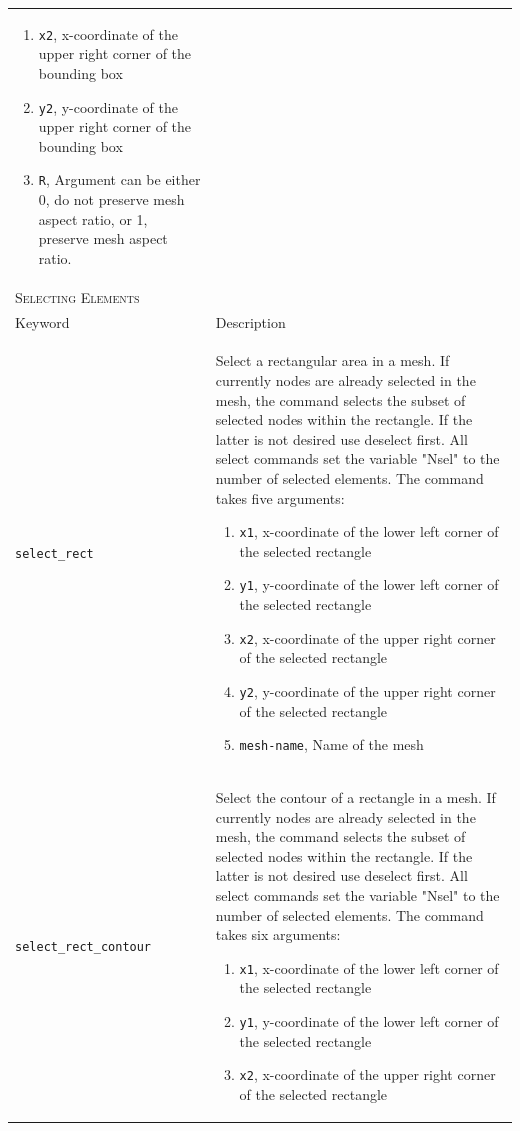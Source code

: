 \documentclass[noshowpacs,preprintnumbers,amsmath,amssymb, letter]{revtex4}
\begin{document}
\begin{longtable}{p{}p{}}
\begin{enumerate}
\item \texttt{x2}, x-coordinate of the upper right corner of the bounding box
\item \texttt{y2}, y-coordinate of the upper right corner of the bounding box
\item \texttt{R}, Argument can be either 0, do not preserve mesh aspect ratio, or 1, preserve mesh aspect ratio. 
\end{enumerate}\\
\multicolumn{2}{l}{\textsc{Selecting Elements}} \\*
\hline
Keyword & Description \\
\texttt{select\_rect}	& Select a rectangular area in a mesh. If currently nodes are already selected in the mesh, the command selects the subset of selected nodes within the rectangle. If the latter is not desired use deselect first. All select commands set the variable "Nsel" to the number of selected elements. The command takes five arguments:
\begin{enumerate}
\item \texttt{x1}, x-coordinate of the lower left corner of the selected rectangle
\item \texttt{y1}, y-coordinate of the lower left corner of the selected rectangle
\item \texttt{x2}, x-coordinate of the upper right corner of the selected rectangle
\item \texttt{y2}, y-coordinate of the upper right corner of the selected rectangle
\item \texttt{mesh-name}, Name of the mesh
\end{enumerate}\\
\texttt{select\_rect\_contour}	& Select the contour of a rectangle in a mesh. If currently nodes are already selected in the mesh, the command selects the subset of selected nodes within the rectangle. If the latter is not desired use deselect first. All select commands set the variable "Nsel" to the number of selected elements. The command takes six arguments:
\begin{enumerate}
\item \texttt{x1}, x-coordinate of the lower left corner of the selected rectangle
\item \texttt{y1}, y-coordinate of the lower left corner of the selected rectangle
\item \texttt{x2}, x-coordinate of the upper right corner of the selected rectangle

\end{enumerate}
\end{longtable}
\end{document}
